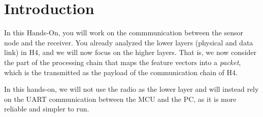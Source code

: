 \section*{Introduction}

In this Hands-On, you will work on the commmunication between the sensor node
and the receiver. You already analyzed the lower layers (physical and data
link) in H4, and we will now focus on the higher layers. That is, we now
consider the part of the processing chain that maps the feature vectors into a
\emph{packet}, which is the transmitted as the payload of the communication
chain of H4.

In this hands-on, we will not use the radio as the lower layer and will instead
rely on the UART communication between the MCU and the PC, as it is more
reliable and simpler to run.